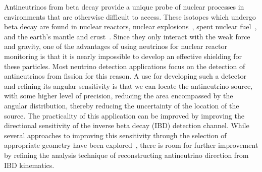\documentclass[tightenlines,
twocolumn,prl,notitlepage,nofootinbib,preprintnumbers,longbibliography]{revtex4-1}
\begin{document}
Antineutrinos from beta decay provide a unique probe of nuclear processes in environments that are otherwise difficult to access. 
These isotopes which undergo beta decay are found in nuclear reactors, nuclear explosions~\cite{Bernstein:2009ab, Foxe:2020vtb, Distel:2024qzg}, spent nuclear fuel~\cite{PhysRevApplied.8.054050,Radermacher:2022pnt, DoubleChooz:2025jal}, and the earth's mantle and crust~\cite{Watanabe:2014, Leyton:2017tza}. Since they only interact with the weak force and gravity, one of the advantages of using neutrinos for nuclear reactor monitoring is that it is nearly impossible to develop an effective shielding for these particles. Most neutrino detection applications focus on the detection of antineutrinos from fission for this reason. A use for developing such a detector and refining its angular sensitivity is that we can locate the antineutrino source, with some higher level of precision, reducing the area encompassed by the angular distribution, thereby reducing the uncertainty of the location of the source. The practicality of this application can be improved by improving the directional sensitivity of the inverse beta decay (IBD) detection channel. While several approaches to improving this sensitivity through the selection of appropriate geometry have been explored~\cite{Duvall:2024cae}, there is room for further improvement by refining the analysis technique of reconstructing antineutrino direction from IBD kinematics. 
\end{document}
